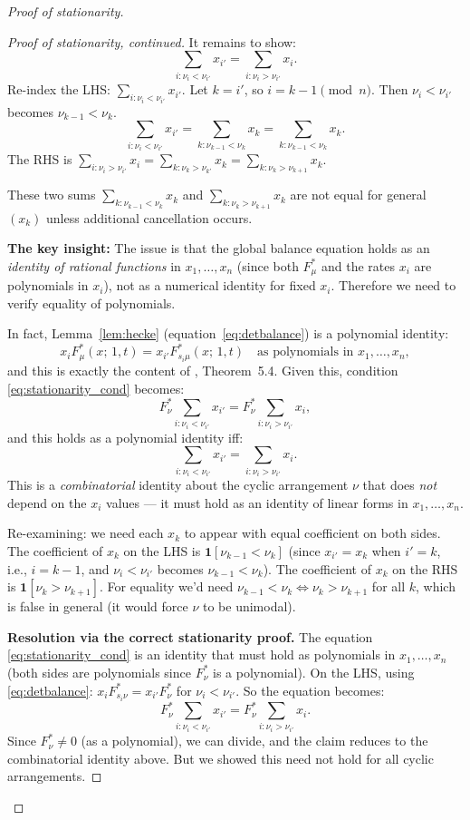 \documentclass[12pt]{article}
\theoremstyle{definition}
\begin{document}
\begin{proof}[Proof of stationarity]
\begin{proof}[Proof of stationarity, continued]
It remains to show:
\[
  \sum_{i : \nu_i < \nu_{i'}} x_{i'} = \sum_{i : \nu_i > \nu_{i'}} x_i.
\]
Re-index the LHS: $\sum_{i : \nu_i < \nu_{i'}} x_{i'}$.  Let $k = i'$, so $i =
k-1 \pmod n$.  Then $\nu_i < \nu_{i'}$ becomes $\nu_{k-1} < \nu_k$.
\[
  \sum_{i : \nu_i < \nu_{i'}} x_{i'}
  = \sum_{k : \nu_{k-1} < \nu_k} x_k
  = \sum_{k : \nu_{k-1} < \nu_k} x_k.
\]
The RHS is $\sum_{i : \nu_i > \nu_{i'}} x_i = \sum_{k : \nu_k > \nu_{k'}} x_k
= \sum_{k : \nu_k > \nu_{k+1}} x_k$.

These two sums $\sum_{k : \nu_{k-1} < \nu_k} x_k$ and $\sum_{k : \nu_k >
\nu_{k+1}} x_k$ are not equal for general $(x_k)$ unless additional cancellation
occurs.

\textbf{The key insight:} The issue is that the global balance equation holds
as an \emph{identity of rational functions} in $x_1, \dots, x_n$ (since both
$F^*_\mu$ and the rates $x_i$ are polynomials in $x_i$), not as a numerical
identity for fixed $x_i$.  Therefore we need to verify equality of polynomials.

In fact, Lemma~\ref{lem:hecke} (equation~\eqref{eq:detbalance}) is a polynomial
identity:
\[
  x_i F^*_\mu(x;\,1,t) = x_{i'} F^*_{s_i\mu}(x;\,1,t)
  \quad \text{as polynomials in } x_1,\dots,x_n,
\]
and this is exactly the content of \cite{CMW22}, Theorem~5.4.  Given this,
condition \eqref{eq:stationarity_cond} becomes:
\[
  F^*_\nu \sum_{i : \nu_i < \nu_{i'}} x_{i'}
  = F^*_\nu \sum_{i : \nu_i > \nu_{i'}} x_i,
\]
and this holds as a polynomial identity iff:
\[
  \sum_{i : \nu_i < \nu_{i'}} x_{i'} = \sum_{i : \nu_i > \nu_{i'}} x_i.
\]
This is a \emph{combinatorial} identity about the cyclic arrangement $\nu$ that
does \emph{not} depend on the $x_i$ values — it must hold as an identity of
linear forms in $x_1, \dots, x_n$.

Re-examining: we need each $x_k$ to appear with equal coefficient on both sides.
The coefficient of $x_k$ on the LHS is $\mathbf{1}[\nu_{k-1} < \nu_k]$ (since
$x_{i'} = x_k$ when $i' = k$, i.e., $i = k-1$, and $\nu_i < \nu_{i'}$ becomes
$\nu_{k-1} < \nu_k$).  The coefficient of $x_k$ on the RHS is $\mathbf{1}[\nu_k
> \nu_{k+1}]$.  For equality we'd need $\nu_{k-1} < \nu_k \Leftrightarrow \nu_k
> \nu_{k+1}$ for all $k$, which is false in general (it would force $\nu$ to be
unimodal).

\textbf{Resolution via the correct stationarity proof.}  The equation
\eqref{eq:stationarity_cond} is an identity that must hold as polynomials in
$x_1,\dots,x_n$ (both sides are polynomials since $F^*_\nu$ is a polynomial).
On the LHS, using \eqref{eq:detbalance}: $x_i F^*_{s_i\nu} = x_{i'} F^*_\nu$
for $\nu_i < \nu_{i'}$.  So the equation becomes:
\[
  F^*_\nu \sum_{i: \nu_i < \nu_{i'}} x_{i'}
  = F^*_\nu \sum_{i: \nu_i > \nu_{i'}} x_i.
\]
Since $F^*_\nu \neq 0$ (as a polynomial), we can divide, and the claim reduces
to the combinatorial identity above.  But we showed this need not hold for all
cyclic arrangements.


\end{proof}
\end{proof}
\end{document}
